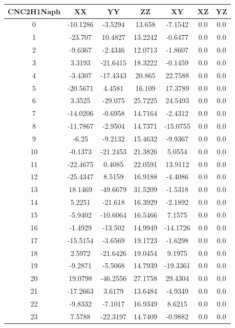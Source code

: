 \documentclass[journal=jacsat,manuscript=article]{achemso}
\begin{document}
\begin{table}
\tiny
\centering
   \begin{tabular}{ccccccc}
    \hline
CNC2H1Naph & XX & YY & ZZ & XY &  XZ & YZ \\
\hline
0 & -10.1286 & -3.5294 & 13.658 & -7.1542 & 0.0 & 0.0 \\ 
1 & -23.707 & 10.4827 & 13.2242 & -0.6477 & 0.0 & 0.0 \\ 
2 & -9.6367 & -2.4346 & 12.0713 & -1.8607 & 0.0 & 0.0 \\ 
3 & 3.3193 & -21.6415 & 18.3222 & -0.1459 & 0.0 & 0.0 \\ 
4 & -3.4307 & -17.4343 & 20.865 & 22.7588 & 0.0 & 0.0 \\ 
5 & -20.5671 & 4.4581 & 16.109 & 17.3789 & 0.0 & 0.0 \\ 
6 & 3.3525 & -29.075 & 25.7225 & 24.5493 & 0.0 & 0.0 \\ 
7 & -14.0206 & -0.6958 & 14.7164 & -2.4312 & 0.0 & 0.0 \\ 
8 & -11.7867 & -2.9504 & 14.7371 & -15.0755 & 0.0 & 0.0 \\ 
9 & -6.25 & -9.2132 & 15.4632 & -9.9367 & 0.0 & 0.0 \\ 
10 & -0.1373 & -21.2453 & 21.3826 & 5.0554 & 0.0 & 0.0 \\ 
11 & -22.4675 & 0.4085 & 22.0591 & 13.9112 & 0.0 & 0.0 \\ 
12 & -25.4347 & 8.5159 & 16.9188 & -4.4086 & 0.0 & 0.0 \\ 
13 & 18.1469 & -49.6679 & 31.5209 & -1.5318 & 0.0 & 0.0 \\ 
14 & 5.2251 & -21.618 & 16.3929 & -2.1892 & 0.0 & 0.0 \\ 
15 & -5.9402 & -10.6064 & 16.5466 & 7.1575 & 0.0 & 0.0 \\ 
16 & -1.4929 & -13.502 & 14.9949 & -14.1726 & 0.0 & 0.0 \\ 
17 & -15.5154 & -3.6569 & 19.1723 & -1.6298 & 0.0 & 0.0 \\ 
18 & 2.5972 & -21.6426 & 19.0454 & 9.1975 & 0.0 & 0.0 \\ 
19 & -9.2871 & -5.5068 & 14.7939 & -19.3361 & 0.0 & 0.0 \\ 
20 & 19.0798 & -46.2556 & 27.1758 & 29.4304 & 0.0 & 0.0 \\ 
21 & -17.2663 & 3.6179 & 13.6484 & -4.9349 & 0.0 & 0.0 \\ 
22 & -9.8332 & -7.1017 & 16.9349 & 8.6215 & 0.0 & 0.0 \\ 
23 & 7.5788 & -22.3197 & 14.7409 & -0.9882 & 0.0 & 0.0 \\ 

\end{tabular}
\end{table}
\end{document}
